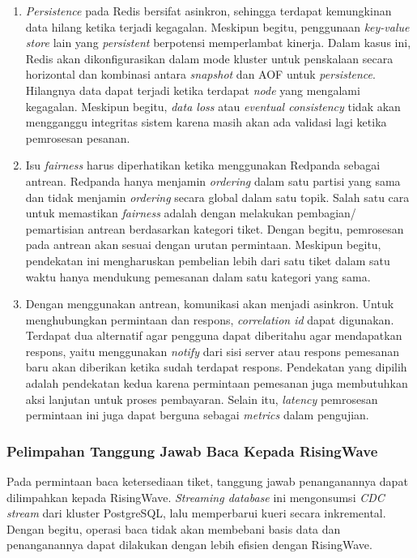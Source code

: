 \begin{enumerate}
    \item \textit{Persistence} pada Redis bersifat asinkron, sehingga terdapat kemungkinan data hilang ketika terjadi kegagalan. Meskipun begitu, penggunaan \textit{key-value store} lain yang \textit{persistent} berpotensi memperlambat kinerja. Dalam kasus ini, Redis akan dikonfigurasikan dalam mode kluster untuk penskalaan secara horizontal dan kombinasi antara \textit{snapshot} dan AOF untuk \textit{persistence}. Hilangnya data dapat terjadi ketika terdapat \textit{node} yang mengalami kegagalan. Meskipun begitu, \textit{data loss} atau \textit{eventual consistency} tidak akan mengganggu integritas sistem karena masih akan ada validasi lagi ketika pemrosesan pesanan.
    \item Isu \textit{fairness} harus diperhatikan ketika menggunakan Redpanda sebagai antrean. Redpanda hanya menjamin \textit{ordering} dalam satu partisi yang sama dan tidak menjamin \textit{ordering} secara global dalam satu topik. Salah satu cara untuk memastikan \textit{fairness} adalah dengan melakukan pembagian/ pemartisian antrean berdasarkan kategori tiket. Dengan begitu, pemrosesan pada antrean akan sesuai dengan urutan permintaan. Meskipun begitu, pendekatan ini mengharuskan pembelian lebih dari satu tiket dalam satu waktu hanya mendukung pemesanan dalam satu kategori yang sama.
    \item Dengan menggunakan antrean, komunikasi akan menjadi asinkron. Untuk menghubungkan permintaan dan respons, \textit{correlation id} dapat digunakan. Terdapat dua alternatif agar pengguna dapat diberitahu agar mendapatkan respons, yaitu menggunakan \textit{notify} dari sisi server atau respons pemesanan baru akan diberikan ketika sudah terdapat respons. Pendekatan yang dipilih adalah pendekatan kedua karena permintaan pemesanan juga membutuhkan aksi lanjutan untuk proses pembayaran. Selain itu, \textit{latency} pemrosesan permintaan ini juga dapat berguna sebagai \textit{metrics} dalam pengujian.
\end{enumerate}

\subsubsection{Pelimpahan Tanggung Jawab Baca Kepada RisingWave}

Pada permintaan baca ketersediaan tiket, tanggung jawab penanganannya dapat dilimpahkan kepada RisingWave. \textit{Streaming database} ini mengonsumsi \textit{CDC stream} dari kluster PostgreSQL, lalu memperbarui kueri secara inkremental. Dengan begitu, operasi baca tidak akan membebani basis data dan penanganannya dapat dilakukan dengan lebih efisien dengan RisingWave.

